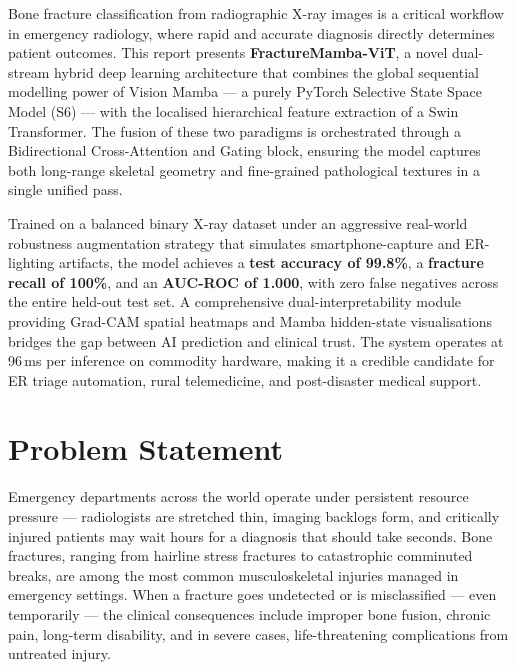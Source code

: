 \documentclass[12pt, a4paper]{article}
\begin{document}
\begin{tcolorbox}[abstractbox]
Bone fracture classification from radiographic X-ray images is a critical workflow in emergency
radiology, where rapid and accurate diagnosis directly determines patient outcomes. This report
presents \textbf{FractureMamba-ViT}, a novel dual-stream hybrid deep learning architecture that
combines the global sequential modelling power of Vision Mamba — a purely PyTorch Selective
State Space Model (S6) — with the localised hierarchical feature extraction of a Swin
Transformer. The fusion of these two paradigms is orchestrated through a Bidirectional
Cross-Attention and Gating block, ensuring the model captures both long-range skeletal geometry
and fine-grained pathological textures in a single unified pass.

Trained on a balanced binary X-ray dataset under an aggressive real-world robustness augmentation
strategy that simulates smartphone-capture and ER-lighting artifacts, the model achieves a
\textbf{test accuracy of 99.8\%}, a \textbf{fracture recall of 100\%}, and an
\textbf{AUC-ROC of 1.000}, with zero false negatives across the entire held-out test set. A
comprehensive dual-interpretability module providing Grad-CAM spatial heatmaps and Mamba
hidden-state visualisations bridges the gap between AI prediction and clinical trust. The system
operates at 96\,ms per inference on commodity hardware, making it a credible candidate for ER
triage automation, rural telemedicine, and post-disaster medical support.
\end{tcolorbox}

\section{Problem Statement}

Emergency departments across the world operate under persistent resource pressure — radiologists
are stretched thin, imaging backlogs form, and critically injured patients may wait hours for a
diagnosis that should take seconds. Bone fractures, ranging from hairline stress fractures to
catastrophic comminuted breaks, are among the most common musculoskeletal injuries managed in
emergency settings. When a fracture goes undetected or is misclassified — even temporarily —
the clinical consequences include improper bone fusion, chronic pain, long-term disability, and
in severe cases, life-threatening complications from untreated injury.
\end{document}
